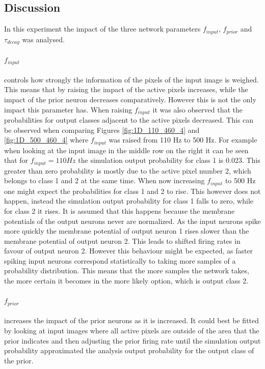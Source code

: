 \subsection{Discussion}

In this experiment the impact of the three network parameters $f_{input}$, $f_{prior}$ and $\tau_{decay}$ was analysed.

\paragraph{$f_{input}$} controls how strongly the information of the pixels of the input image is weighed. This means that by raising the impact of the active pixels increases, while the impact of the prior neuron decreases comparatively. However this is not the only impact this parameter has. When raising $f_{input}$ it was also observed that the probabilities for output classes adjacent to the active pixels decreased. This can be observed when comparing Figures \ref{fig:1D_110_460_4} and \ref{fig:1D_500_460_4} where $f_{input}$ was raised from 110 Hz to 500 Hz. For example when looking at the input image in the middle row on the right it can be seen that for $f_{input} = 110 Hz$ the simulation output probability for class 1 is 0.023. This greater than zero probability is mostly due to the active pixel number 2, which belongs to class 1 and 2 at the same time. When now increasing $f_{input}$ to 500 Hz one might expect the probabilities for class 1 and 2 to rise. This however does not happen, instead the simulation output probability for class 1 falls to zero, while for class 2 it rises.
It is assumed that this happens because the membrane potentials of the output neurons never are normalized. As the input neurons spike more quickly the membrane potential of output neuron 1 rises slower than the membrane potential of output neuron 2. This leads to shifted firing rates in favour of output neuron 2. However this behaviour might be expected, as faster spiking input neurons correspond statistically to taking more samples of a probability distribution. This means that the more samples the network takes, the more certain it becomes in the more likely option, which is output class 2.

\paragraph{$f_{prior}$} increases the impact of the prior neurons as it is increased. It could best be fitted by looking at input images where all active pixels are outside of the area that the prior indicates and then adjusting the prior firing rate until the simulation output probability approximated the analysis output probability for the output class of the prior.

